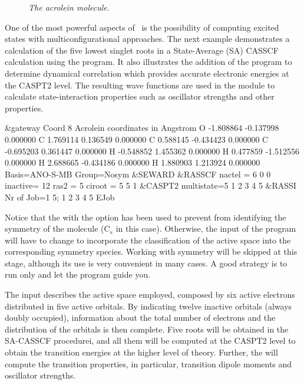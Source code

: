 \ifmanual
\begin{figure}
\centering
{}
\caption{\em The acrolein molecule.}
\label{fig:ac1}
\end{figure}
\fi

One of the most powerful aspects of \molcas\ is the possibility of computing
excited states with multiconfigurational approaches. The next example demonstrates
a calculation of the five lowest singlet roots in a State-Average (SA) CASSCF calculation
using the  program. It also illustrates the addition of the  program
to determine dynamical correlation which provides accurate electronic energies at the CASPT2 level. The resulting
wave functions are used in the  module to calculate state-interaction properties such as oscillator strengths and other properties.

\begin{inputlisting}
&gateway
Coord
 8
Acrolein coordinates in Angstrom
 O     -1.808864   -0.137998    0.000000
 C      1.769114    0.136549    0.000000
 C      0.588145   -0.434423    0.000000
 C     -0.695203    0.361447    0.000000
 H     -0.548852    1.455362    0.000000
 H      0.477859   -1.512556    0.000000
 H      2.688665   -0.434186    0.000000
 H      1.880903    1.213924    0.000000
Basis=ANO-S-MB
Group=Nosym
&SEWARD
&RASSCF
  nactel  = 6 0 0
  inactive= 12
  ras2    = 5
  ciroot  = 5 5 1
&CASPT2
  multistate=5 1 2 3 4 5
&RASSI
  Nr of Job=1 5; 1 2 3 4 5
  EJob
\end{inputlisting}

Notice that the  with the option  has been used
to prevent  from identifying the symmetry of the molecule
(C$_s$ in this case). Otherwise, the input of the  program
will have to change to incorporate the classification of the active space
into the corresponding symmetry species. Working with symmetry will be skipped at
this stage, although its use is very convenient in many cases.
A good strategy is to run only  and let the program guide you.

The  input describes the active space employed, composed by
six active electrons distributed in five active orbitals. By indicating
twelve inactive orbitals (always doubly occupied), information
about the total number of electrons and the distribution of the orbitals is then complete.
Five roots will be obtained in the SA-CASSCF procedurei, and all them will
be computed at the CASPT2 level to obtain the transition energies at the higher
level of theory. Further, the  will compute the transition properties,
in particular, transition dipole moments and oscillator strengths.

